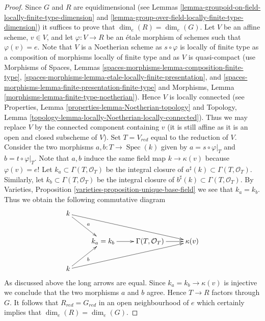 \documentclass{stacks-project}
\theoremstyle{plain}
\theoremstyle{definition}
\theoremstyle{remark}
\numberwithin{equation}{subsection}
\def\Spec{\mathop{\mathrm{Spec}}}
\begin{document}
\begin{proof}
Since $G$ and $R$ are equidimensional (see
Lemmas \ref{lemma-groupoid-on-field-locally-finite-type-dimension} and
\ref{lemma-group-over-field-locally-finite-type-dimension})
it suffices to prove that $\dim_e(R) = \dim_e(G)$. Let $V$ be an affine scheme,
$v \in V$, and let $\varphi : V \to R$ be an \'etale morphism of schemes
such that $\varphi(v) = e$. Note that $V$ is a Noetherian scheme as
$s \circ \varphi$ is locally of finite type as a composition of morphisms
locally of finite type and as $V$ is quasi-compact (use
Morphisms of Spaces, Lemmas
\ref{spaces-morphisms-lemma-composition-finite-type},
\ref{spaces-morphisms-lemma-etale-locally-finite-presentation}, and
\ref{spaces-morphisms-lemma-finite-presentation-finite-type}
and
Morphisms, Lemma \ref{morphisms-lemma-finite-type-noetherian}).
Hence $V$ is locally connected (see
Properties, Lemma \ref{properties-lemma-Noetherian-topology}
and
Topology, Lemma \ref{topology-lemma-locally-Noetherian-locally-connected}).
Thus we may replace $V$ by the connected component containing $v$ (it
is still affine as it is an open and closed subscheme of $V$).
Set $T = V_{red}$ equal to the reduction of $V$. Consider the two
morphisms $a, b : T \to \Spec(k)$ given by
$a = s \circ \varphi|_T$ and $b = t \circ \varphi|_T$. Note that
$a, b$ induce the same field map $k \to \kappa(v)$ because $\varphi(v) = e$!
Let $k_a \subset \Gamma(T, \mathcal{O}_T)$ be the integral closure of
$a^\sharp(k) \subset \Gamma(T, \mathcal{O}_T)$. Similarly, let
$k_b \subset \Gamma(T, \mathcal{O}_T)$ be the integral closure of
$b^\sharp(k) \subset \Gamma(T, \mathcal{O}_T)$. By
Varieties, Proposition \ref{varieties-proposition-unique-base-field}
we see that $k_a = k_b$. Thus we obtain the following commutative diagram
$$
\xymatrix{
k \ar[rd]^a \ar[rrrd] \\
& k_a = k_b \ar[r] & \Gamma(T, \mathcal{O}_T) \ar[r] & \kappa(v) \\
k \ar[ru]_b \ar[rrru]
}
$$
As discussed above the long arrows are equal.
Since $k_a = k_b \to \kappa(v)$ is injective we conclude that
the two morphisms $a$ and $b$ agree. Hence $T \to R$ factors through $G$.
It follows that $R_{red} = G_{red}$ in an open neighbourhood of $e$
which certainly implies that $\dim_e(R) = \dim_e(G)$.
\end{proof}
\end{document}
